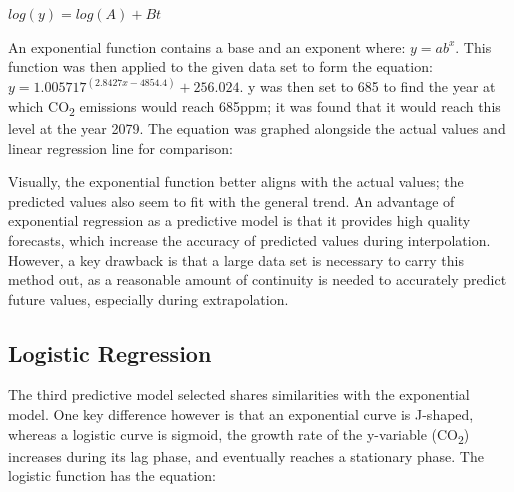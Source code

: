 \documentclass{mcmthesis}
\begin{document}
    ${log(y) = log (A) + B t}$
    
    An exponential function contains a base and an exponent where: ${y = a b ^x}$. This function was then applied to the given data set to form the equation: ${y = 1.005717^(2.8427x - 4854.4) + 256.024}$. {y} was then set to 685 to find the year at which CO\textsubscript{2} emissions would reach 685ppm; it was found that it would reach this level at the year 2079. The equation was graphed alongside the actual values and linear regression line for comparison: 

    \begin{center}
    \end{center}

    Visually, the exponential function better aligns with the actual values; the predicted values also seem to fit with the general trend. An advantage of exponential regression as a predictive model is that it provides high quality forecasts, which increase the accuracy of predicted values during interpolation. However, a key drawback is that a large data set is necessary to carry this method out, as a reasonable amount of continuity is needed to accurately predict future values, especially during extrapolation.

    \subsection{Logistic Regression}
    The third predictive model selected shares similarities with the exponential model. One key difference however is that an exponential curve is J-shaped, whereas a logistic curve is sigmoid, the growth rate of the y-variable (CO\textsubscript{2}) increases during its lag phase, and eventually reaches a stationary phase. The logistic function has the equation:
\end{document}
